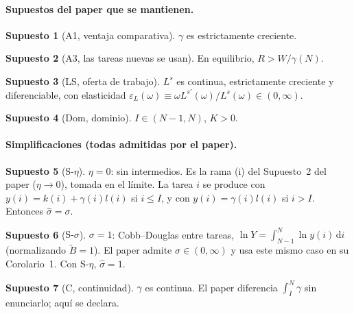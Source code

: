 \documentclass[11pt,a4paper]{article}
\numberwithin{equation}{section}
\theoremstyle{definition}
\newtheorem{supuestoS}{Supuesto}
\theoremstyle{plain}
\theoremstyle{remark}
\newcommand{\eps}{\varepsilon}
\newcommand{\dd}{\,\mathrm{d}}
\newcommand{\sh}{\hat\sigma}
\begin{document}
\paragraph{Supuestos del paper que se mantienen.}
\begin{supuestoS}[\textsf{A1}, ventaja comparativa]\label{A1}
$\gamma$ es estrictamente creciente.
\end{supuestoS}
\begin{supuestoS}[\textsf{A3}, las tareas nuevas se usan]\label{A3}
En equilibrio, $R>W/\gamma(N)$.
\end{supuestoS}
\begin{supuestoS}[\textsf{LS}, oferta de trabajo]\label{LS}
$L^s$ es continua, estrictamente creciente y diferenciable, con elasticidad
$\eps_L(\omega)\equiv \omega L^{s\prime}(\omega)/L^s(\omega)\in(0,\infty)$.
\end{supuestoS}
\begin{supuestoS}[\textsf{Dom}, dominio]\label{Dom}
$I\in(N-1,N)$, $K>0$.
\end{supuestoS}

\paragraph{Simplificaciones (todas admitidas por el paper).}
\begin{supuestoS}[\textsf{S-$\eta$}]\label{Seta}
$\eta=0$: sin intermedios. Es la rama (i) del Supuesto~2 del paper ($\eta\to0$), tomada en el límite. La tarea
$i$ se produce con $y(i)=k(i)+\gamma(i)l(i)$ si $i\le I$, y con $y(i)=\gamma(i)l(i)$ si $i>I$. Entonces
$\sh=\sigma$.
\end{supuestoS}
\begin{supuestoS}[\textsf{S-$\sigma$}]\label{Ssigma}
$\sigma=1$: Cobb--Douglas entre tareas, $\ln Y=\int_{N-1}^{N}\ln y(i)\dd i$ (normalizando $\tilde B=1$). El paper
admite $\sigma\in(0,\infty)$ y usa este mismo caso en su Corolario~1. Con \textsf{S-$\eta$}, $\sh=1$.
\end{supuestoS}
\begin{supuestoS}[\textsf{C}, continuidad]\label{C}
$\gamma$ es continua. El paper diferencia $\int_{I}^{N}\gamma$ sin enunciarlo; aquí se declara.
\end{supuestoS}
\end{document}
